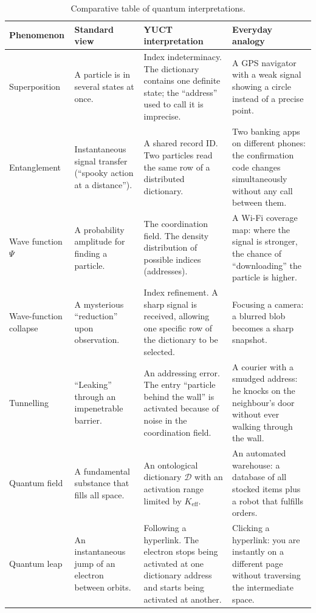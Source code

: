 \documentclass[12pt,a4paper]{article}
\theoremstyle{remark}
\begin{document}
	\begin{table}[H]
		\centering
		\caption{Comparative table of quantum interpretations.}
		\label{tab:quantum-interpretations}
		\small
		\begin{tabularx}{\textwidth}{p{2.5cm} p{2.8cm} p{4.2cm} p{4.5cm}}
			\toprule
			\textbf{Phenomenon} & \textbf{Standard view} & \textbf{YUCT interpretation} & \textbf{Everyday analogy} \\
			\midrule
			Superposition &
			A particle is in several states at once. &
			Index indeterminacy. The dictionary contains one definite state; the ``address'' used to call it is imprecise. &
			A GPS navigator with a weak signal showing a circle instead of a precise point. \\
			\addlinespace
			Entanglement &
			Instantaneous signal transfer (``spooky action at a distance''). &
			A shared record ID. Two particles read the same row of a distributed dictionary. &
			Two banking apps on different phones: the confirmation code changes simultaneously without any call between them. \\
			\addlinespace
			Wave function \( \Psi \) &
			A probability amplitude for finding a particle. &
			The coordination field. The density distribution of possible indices (addresses). &
			A Wi-Fi coverage map: where the signal is stronger, the chance of ``downloading'' the particle is higher. \\
			\addlinespace
			Wave-function collapse &
			A mysterious ``reduction'' upon observation. &
			Index refinement. A sharp signal is received, allowing one specific row of the dictionary to be selected. &
			Focusing a camera: a blurred blob becomes a sharp snapshot. \\
			\addlinespace
			Tunnelling &
			``Leaking'' through an impenetrable barrier. &
			An addressing error. The entry ``particle behind the wall'' is activated because of noise in the coordination field. &
			A courier with a smudged address: he knocks on the neighbour's door without ever walking through the wall. \\
			\addlinespace
			Quantum field &
			A fundamental substance that fills all space. &
			An ontological dictionary \( \mathcal{D} \) with an activation range limited by \( K_{\mathrm{eff}} \). &
			An automated warehouse: a database of all stocked items plus a robot that fulfills orders. \\
			\addlinespace
			Quantum leap &
			An instantaneous jump of an electron between orbits. &
			Following a hyperlink. The electron stops being activated at one dictionary address and starts being activated at another. &
			Clicking a hyperlink: you are instantly on a different page without traversing the intermediate space. \\
			\bottomrule
		\end{tabularx}
	\end{table}
	
\end{document}
